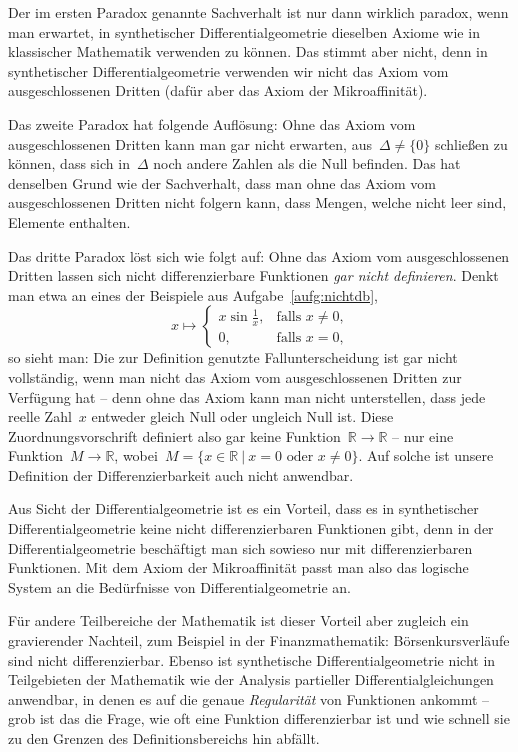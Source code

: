 \documentclass[twoside]{../zirkelblatt}
\newcommand{\RR}{\mathbb{R}}
\theoremstyle{definition}
\theoremstyle{plain}
\theoremstyle{remark}
\begin{document}
Der im ersten Paradox genannte Sachverhalt ist nur dann wirklich paradox, wenn
man erwartet, in synthetischer Differentialgeometrie dieselben Axiome wie in
klassischer Mathematik verwenden zu können. Das stimmt aber nicht, denn in
synthetischer Differentialgeometrie verwenden wir nicht das Axiom vom
ausgeschlossenen Dritten (dafür aber das Axiom der Mikroaffinität).

Das zweite Paradox hat folgende Auflösung: Ohne das Axiom vom ausgeschlossenen
Dritten kann man gar nicht erwarten, aus~$\Delta \neq \{0\}$ schließen zu
können, dass sich in~$\Delta$ noch andere Zahlen als die Null befinden.
Das hat denselben Grund wie der Sachverhalt, dass man ohne das Axiom vom
ausgeschlossenen Dritten nicht folgern kann, dass Mengen, welche nicht leer
sind, Elemente enthalten.

Das dritte Paradox löst sich wie folgt auf: Ohne das Axiom vom ausgeschlossenen
Dritten lassen sich nicht differenzierbare Funktionen \emph{gar nicht definieren}.
Denkt man etwa an eines der Beispiele aus Aufgabe~\ref{aufg:nichtdb},
\[ x \longmapsto \begin{cases}x \sin\frac{1}{x}, & \text{falls $x \neq 0$,} \\
0, & \text{falls $x = 0$,}\end{cases} \]
so sieht man: Die zur Definition genutzte Fallunterscheidung ist gar nicht
vollständig, wenn man nicht das Axiom vom ausgeschlossenen Dritten zur
Verfügung hat -- denn ohne das Axiom kann man nicht unterstellen, dass jede reelle
Zahl~$x$ entweder gleich Null oder ungleich Null ist. Diese
Zuordnungsvorschrift definiert also gar keine Funktion~$\RR \to \RR$ -- nur
eine Funktion~$M \to \RR$, wobei~$M = \{ x \in \RR \ |\ \text{$x = 0$ oder $x \neq 0$} \}$.
Auf solche ist unsere Definition der Differenzierbarkeit auch nicht anwendbar.

Aus Sicht der Differentialgeometrie ist es ein Vorteil, dass es in
synthetischer Differentialgeometrie keine nicht differenzierbaren Funktionen
gibt, denn in der Differentialgeometrie beschäftigt man sich sowieso nur mit
differenzierbaren Funktionen. Mit dem Axiom der Mikroaffinität passt man also
das logische System an die Bedürfnisse von Differentialgeometrie an.

Für andere Teilbereiche der Mathematik ist dieser Vorteil aber zugleich ein
gravierender Nachteil, zum Beispiel in der Finanzmathematik: Börsenkursverläufe
sind nicht differenzierbar. Ebenso ist synthetische Differentialgeometrie nicht
in Teilgebieten der Mathematik wie der Analysis partieller
Differentialgleichungen anwendbar, in denen es auf die genaue
\emph{Regularität} von Funktionen ankommt -- grob ist das die Frage, wie oft eine
Funktion differenzierbar ist und wie schnell sie zu den Grenzen des
Definitionsbereichs hin abfällt.\enlargethispage{1em}
\end{document}
